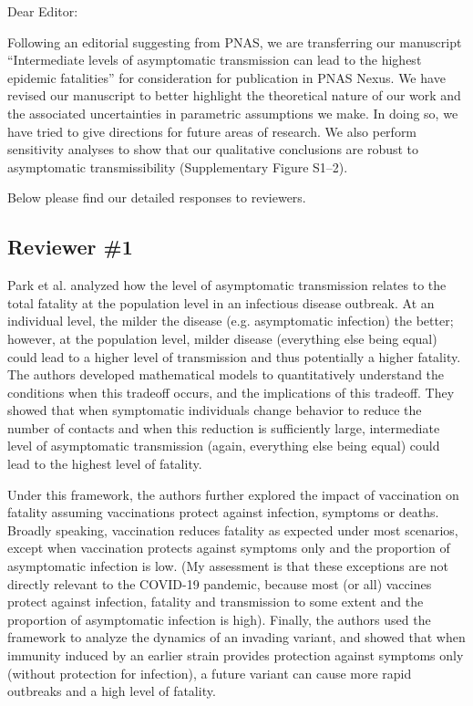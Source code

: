 \documentclass[12pt]{article}
\newcommand{\rev}{\subsection*}
\newcommand{\revtext}{\textsf}
\begin{document}
\noindent Dear Editor:

Following an editorial suggesting from PNAS, we are transferring our manuscript ``Intermediate levels of asymptomatic transmission can lead to the highest epidemic fatalities'' for consideration for publication in PNAS Nexus.
We have revised our manuscript to better highlight the theoretical nature of our work and the associated uncertainties in parametric assumptions we make.
In doing so, we have tried to give directions for future areas of research.
We also perform sensitivity analyses to show that our qualitative conclusions are robust to asymptomatic transmissibility (Supplementary Figure S1--2).

Below please find our detailed responses to reviewers.

\rev{Reviewer \#1}

\revtext{Park et al. analyzed how the level of asymptomatic transmission relates to the total fatality at the population level in an infectious disease outbreak. At an individual level, the milder the disease (e.g. asymptomatic infection) the better; however, at the population level, milder disease (everything else being equal) could lead to a higher level of transmission and thus potentially a higher fatality. The authors developed mathematical models to quantitatively understand the conditions when this tradeoff occurs, and the implications of this tradeoff. They showed that when symptomatic individuals change behavior to reduce the number of contacts and when this reduction is sufficiently large, intermediate level of asymptomatic transmission (again, everything else being equal) could lead to the highest level of fatality.}

\revtext{Under this framework, the authors further explored the impact of vaccination on fatality assuming vaccinations protect against infection, symptoms or deaths. Broadly speaking, vaccination reduces fatality as expected under most scenarios, except when vaccination protects against symptoms only and the proportion of asymptomatic infection is low. (My assessment is that these exceptions are not directly relevant to the COVID-19 pandemic, because most (or all) vaccines protect against infection, fatality and transmission to some extent and the proportion of asymptomatic infection is high). Finally, the authors used the framework to analyze the dynamics of an invading variant, and showed that when immunity induced by an earlier strain provides protection against symptoms only (without protection for infection), a future variant can cause more rapid outbreaks and a high level of fatality.}
\end{document}
